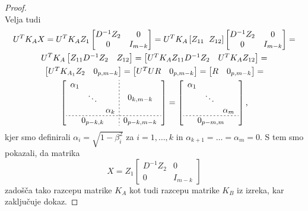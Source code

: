 \documentclass[mat1]{article}
\theoremstyle{definition}
\begin{document}
\begin{proof}
$$$$
Velja tudi
\begin{gather*}
U^T K_A X =
U^T K_A Z_1
\begin{bmatrix}
D^{-1} Z_2 & 0\\ 
0 & I_{m-k}
\end{bmatrix} = 
U^T K_A %
\left[Z_{11} \hspace{2mm} Z_{12} \right]
\begin{bmatrix}
D^{-1} Z_2 & 0\\ 
0 & I_{m-k}
\end{bmatrix} = \\
U^T K_A
\begin{bmatrix}
 Z_{11} D^{-1} Z_2 & Z_{12} 
\end{bmatrix} =
\begin{bmatrix}
U^T K_A Z_{11} D^{-1} Z_2 & U^T K_A Z_{12} 
\end{bmatrix} = \\
\begin{bmatrix}
U^T K_{A_1} Z_2 & 0_{p, m-k} 
\end{bmatrix} =
\begin{bmatrix}
U^T U R & 0_{p, m-k}
\end{bmatrix} =
\begin{bmatrix}
R & 0_{p, m-k} 
\end{bmatrix} = \\
\left[
\begin{array}{c;{2pt/2pt}c}
\begin{matrix}
\alpha_1 & & \\
 & \ddots & \\
 & & \alpha_k
\end{matrix} & 0_{k, m-k}
 \\ \hdashline[2pt/2pt]
0_{p-k, k} & 0_{p-k, m-k}
\end{array} \right] =
\left[
\begin{array}{c}
\begin{matrix}
\alpha_1 & & \\
 & \ddots & \\
 & & \alpha_m
\end{matrix}
 \\ \hdashline[2pt/2pt]
0_{p-m, m}
\end{array} \right] 
\text{,}
\end{gather*}
kjer smo definirali $\alpha_i = \sqrt{1-\beta_i^2}$ za $i = 1, \ldots, k$ in $\alpha_{k+1} = \ldots = \alpha_m = 0$.
S tem smo pokazali, da matrika $$ X = Z_1 
\begin{bmatrix}
D^{-1} Z_2 & 0\\ 
0 & I_{m-k}
\end{bmatrix}
$$
zadošča tako razcepu matrike $K_A$ kot tudi razcepu matrike $K_B$ iz izreka, kar zaključuje dokaz.
\end{proof}
\end{document}
